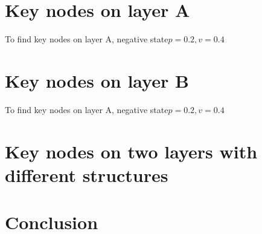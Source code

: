 \section{Key nodes on layer A}
To find key nodes on layer A, negative state$p=0.2, v=0.4$


\section{Key nodes on layer B}
To find key nodes on layer A, negative state$p=0.2, v=0.4$


\section{Key nodes on two layers with different structures}


\section{Conclusion}
